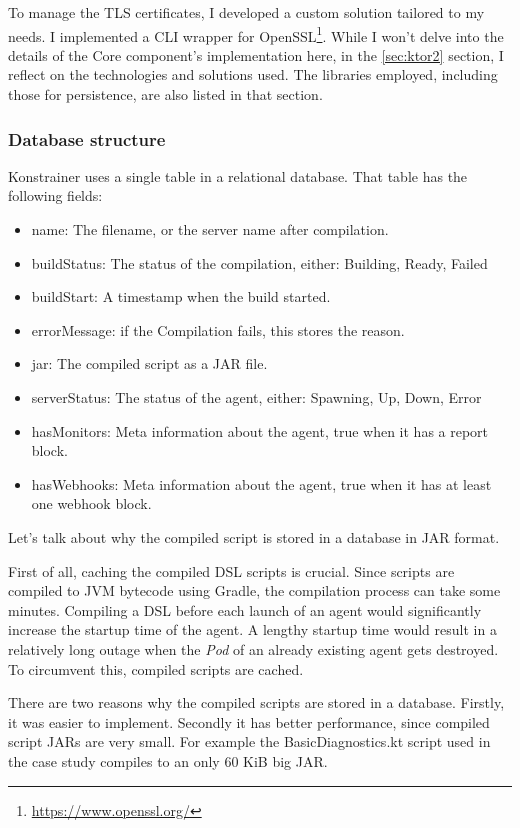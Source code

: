 To manage the TLS certificates, I developed a custom solution tailored to my needs. I implemented a CLI wrapper for OpenSSL\footnote{\url{https://www.openssl.org/}}. While I won't delve into the details of the Core component's implementation here, in the \ref{sec:ktor2} section, I reflect on the technologies and solutions used. The libraries employed, including those for persistence, are also listed in that section.

\subsubsection{Database structure}

Konstrainer uses a single table in a relational database. That table has the following fields:

\begin{itemize}
    \item name: The filename, or the server name after compilation.
    \item buildStatus: The status of the compilation, either: Building, Ready, Failed
    \item buildStart: A timestamp when the build started.
    \item errorMessage: if the Compilation fails, this stores the reason.
    \item jar: The compiled script as a JAR file.
    \item serverStatus: The status of the agent, either: Spawning, Up, Down, Error
    \item hasMonitors: Meta information about the agent, true when it has a report block.
    \item hasWebhooks: Meta information about the agent, true when it has at least one webhook block.
\end{itemize}

Let's talk about why the compiled script is stored in a database in JAR format.

First of all, caching the compiled DSL scripts is crucial. Since scripts are compiled to JVM bytecode using Gradle, the compilation process can take some minutes. Compiling a DSL before each launch of an agent would significantly increase the startup time of the agent. A lengthy startup time would result in a relatively long outage when the \emph{Pod} of an already existing agent gets destroyed. To circumvent this, compiled scripts are cached.

There are two reasons why the compiled scripts are stored in a database. Firstly, it was easier to implement. Secondly it has better performance, since compiled script JARs are very small. For example the BasicDiagnostics.kt script used in the case study compiles to an only 60 KiB big JAR.


